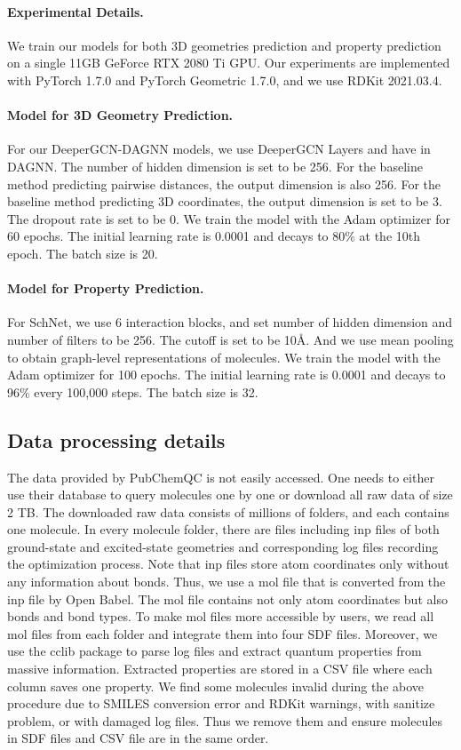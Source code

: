 \documentclass{article}
\begin{document}
\paragraph{Experimental Details.} We train our models for both 3D geometries prediction and property prediction on a single 11GB GeForce RTX 2080 Ti GPU. Our experiments are implemented with PyTorch 1.7.0 and PyTorch Geometric 1.7.0, and we use RDKit 2021.03.4. 

\paragraph{Model for 3D Geometry Prediction.} For our DeeperGCN-DAGNN models, we use  DeeperGCN Layers and have  in DAGNN. The number of hidden dimension is set to be 256. For the baseline method predicting pairwise distances, the output dimension is also 256. For the baseline method predicting 3D coordinates, the output dimension is set to be 3. The dropout rate is set to be 0. We train the model with the Adam optimizer \cite{kingma2015adam} for 60 epochs. The initial learning rate is 0.0001 and decays to 80\% at the 10th epoch. The batch size is 20. 

\paragraph{Model for Property Prediction.} For SchNet, we use 6 interaction blocks, and set number of hidden dimension and number of filters to be 256. The cutoff is set to be 10\AA. And we use mean pooling to obtain graph-level representations of molecules. We train the model with the Adam optimizer for 100 epochs. The initial learning rate is 0.0001 and decays to 96\% every 100,000 steps. The batch size is 32. 

\subsection{Data processing details} \label{sec:data_details}
The data provided by PubChemQC is not easily accessed. One needs to either use their database to query molecules one by one or download all raw data of size 2 TB. The downloaded raw data consists of millions of folders, and each contains one molecule. In every molecule folder, there are files including inp files of both ground-state and excited-state geometries and corresponding log files recording the optimization process. Note that inp files store atom coordinates only without any information about bonds. Thus, we use a mol file that is converted from the inp file by Open Babel. The mol file contains not only atom coordinates but also bonds and bond types. To make mol files more accessible by users, we read all mol files from each folder and integrate them into four SDF files. Moreover, we use the cclib package \cite{o2008cclib} to parse log files and extract quantum properties from massive information. Extracted properties are stored in a CSV file where each column saves one property. We find some molecules invalid during the above procedure due to SMILES conversion error and RDKit warnings, with sanitize problem, or with damaged log files. Thus we remove them and ensure molecules in SDF files and CSV file are in the same order.
\end{document}
